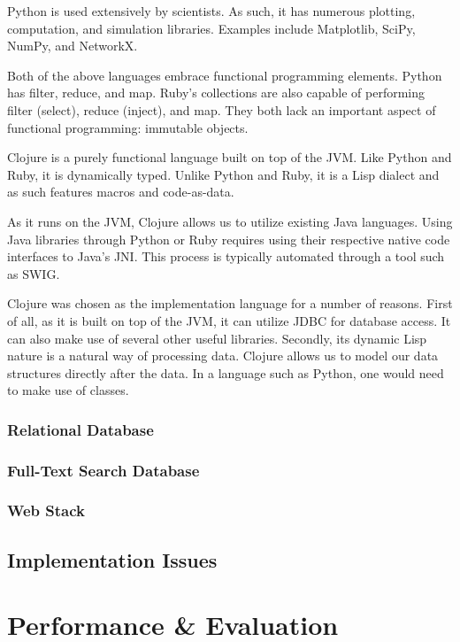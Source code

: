 \documentclass[12pt,letterpaper,oneside]{report}
\theoremstyle{definition}
\begin{document}
				Python is used extensively by scientists.  As such, it has numerous plotting, computation, and simulation libraries.  Examples include Matplotlib, SciPy, NumPy, and NetworkX.
				
				Both of the above languages embrace functional programming elements.  Python has filter, reduce, and map.  Ruby's collections are also capable of performing filter (select), reduce (inject), and map.  They both lack an important aspect of functional programming:  immutable objects.
				
				Clojure is a purely functional language built on top of the JVM.  Like Python and Ruby, it is dynamically typed.  Unlike Python and Ruby, it is a Lisp dialect and as such features macros and code-as-data.
				
				As it runs on the JVM, Clojure allows us to utilize existing Java languages.  Using Java libraries through Python or Ruby requires using their respective native code interfaces to Java's JNI.  This process is typically automated through a tool such as SWIG.
				
				Clojure was chosen as the implementation language for a number of reasons.  First of all, as it is built on top of the JVM, it can utilize JDBC for database access.  It can also make use of several other useful libraries.  Secondly, its dynamic Lisp nature is a natural way of processing data.  Clojure allows us to model our data structures directly after the data.  In a language such as Python, one would need to make use of classes.
			
			\subsection{Relational Database}
			
			\subsection{Full-Text Search Database}
			
			\subsection{Web Stack}
		
		\section{Implementation Issues}
	
	\chapter{Performance \& Evaluation}
\end{document}
